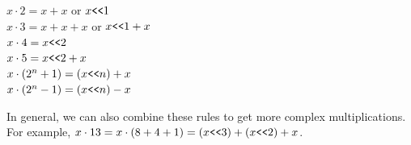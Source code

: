 \begin{center}
    $x\cdot2 = x+x$ or  $x\verb|<<|1$ \\
    $x\cdot3 = x+x+x$ or  $x\verb|<<|1 + x$ \\
    $x\cdot4 = x\verb|<<|2$ \\
    $x\cdot5 = x\verb|<<|2 + x$ \\
    $x\cdot(2^n + 1) = (x\verb|<<|n) + x$ \\
    $x\cdot(2^n - 1) = (x\verb|<<|n) - x$
\end{center}
In general, we can also combine these rules to get more complex multiplications. For example, $x\cdot13 = x\cdot(8 + 4 + 1) = (x\verb|<<|3) + (x\verb|<<|2) + x$.